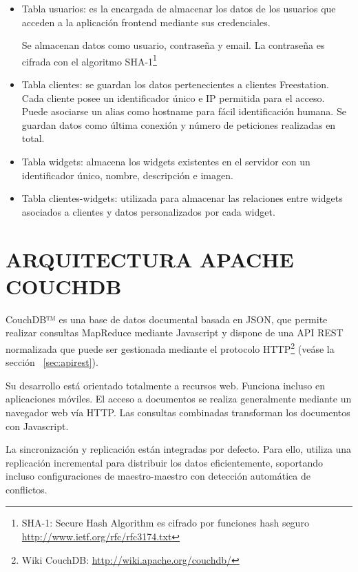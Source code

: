 \begin{itemize}
  \item Tabla usuarios: es la encargada de almacenar los datos de los usuarios
  que acceden a la aplicación frontend mediante sus credenciales.
 
  Se almacenan datos como usuario, contraseña y email. La contraseña es cifrada
  con el algoritmo \acs{SHA}\label{acro:SHA}-1\footnote{SHA-1: Secure Hash
  Algorithm es cifrado por funciones hash seguro \url{http://www.ietf.org/rfc/rfc3174.txt}}

  \item Tabla clientes: se guardan los datos pertenecientes a clientes
  Freestation. Cada cliente posee un identificador único e IP permitida
  para el acceso. Puede asociarse un alias como hostname para fácil
  identificación humana. Se guardan datos como última conexión y número de
  peticiones realizadas en total.

  \item Tabla widgets: almacena los widgets existentes en el servidor con
  un identificador único, nombre, descripción e imagen.
  
  \item Tabla clientes-widgets: utilizada para almacenar las relaciones entre
 widgets asociados a clientes y datos personalizados por cada widget.
\end{itemize}

\section{\uppercase{Arquitectura Apache CouchDB}}
\label{sec:couchdbapache}
CouchDB™ es una base de datos documental basada en JSON, que permite realizar
consultas MapReduce mediante Javascript y dispone de una API REST normalizada
que puede ser gestionada mediante el protocolo HTTP\footnote{Wiki CouchDB:
\url{http://wiki.apache.org/couchdb/}} (veáse la sección ~\ref{sec:apirest}).

Su desarrollo está orientado totalmente a recursos web\cite{AnJ10}. Funciona
incluso en aplicaciones móviles. El acceso a documentos se realiza generalmente mediante un
navegador web vía HTTP. Las consultas combinadas transforman los documentos con
Javascript.

La sincronización y replicación están integradas
por defecto. Para ello, utiliza una replicación incremental para distribuir los
datos eficientemente, soportando incluso configuraciones de maestro-maestro 
con detección automática de conflictos. 

